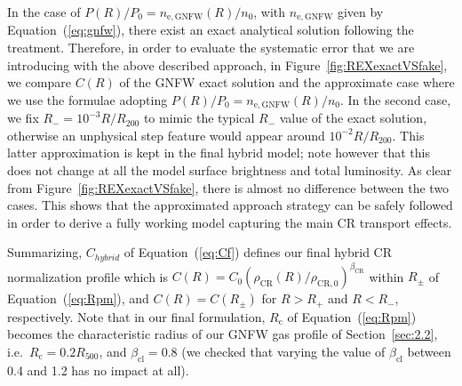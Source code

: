 \documentclass[traditabstract]{aa}
\newcommand{\rmn}{\mathrm}
\begin{document}
\begin{appendix}
In the case of $P(R)/P_{0}=n_{\rmn{e,GNFW}}(R)/n_{0}$, with $n_{\rmn{e,GNFW}}$ given by Equation~(\ref{eq:gnfw}), 
there exist an exact analytical solution following the \cite{2011A&A...527A..99E} treatment. Therefore, in order 
to evaluate the systematic error that we are introducing with the above described approach, 
in Figure~\ref{fig:REXexactVSfake}, we compare $C(R)$ of the GNFW exact solution and the approximate 
case where we use the \cite{2011A&A...527A..99E} formulae adopting $P(R)/P_{0}=n_{\rmn{e,GNFW}}(R)/n_{0}$. 
In the second case, we fix $R_{-}=10^{-3}R/R_{200}$ to mimic the typical $R_{-}$ value of the exact solution, otherwise 
an unphysical step feature would appear around $10^{-2}R/R_{200}$. This latter approximation is kept in the final hybrid 
model; note however that this does not change at all the model surface brightness and total luminosity. 
As clear from Figure~\ref{fig:REXexactVSfake}, there is almost no difference between the two cases. 
This shows that the approximated approach strategy can be safely followed in order to derive a fully working model 
capturing the main CR transport effects. 

Summarizing, $C_{hybrid}$ of Equation~(\ref{eq:Cf}) defines our final hybrid CR normalization profile which is 
$C(R)=C_{0}(\rho_{\rmn{CR}}(R)/\rho_{\rmn{CR},0})^{\beta_{\rmn{CR}}}$ within $R_{\pm}$ of Equation~(\ref{eq:Rpm}), 
and $C(R) = C(R_{\pm})$ for $R > R_{+}$ and $R < R_{-}$, respectively. Note that in our final formulation, 
$R_{\rmn{c}}$ of Equation~(\ref{eq:Rpm}) becomes the characteristic radius of our GNFW gas profile of 
Section~\ref{sec:2.2}, i.e.~$R_{\rmn{c}} = 0.2 R_{500}$, and $\beta_{\rmn{cl}}=0.8$ 
(we checked that varying the value of $\beta_{\rmn{cl}}$ between 0.4 and 1.2 has no impact at all).


\end{appendix}
\end{document}
